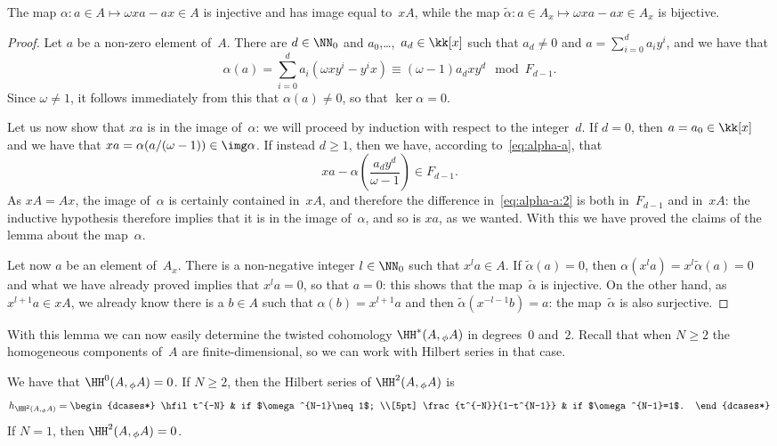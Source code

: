 \begin{Lemma}\label{lemma:comm:phi}
The map $\alpha:a\in A\mapsto \omega xa-ax\in A$ is injective and has image
equal to~$xA$, while the map $\tilde\alpha:a\in A_x\mapsto \omega xa-ax\in
A_x$ is bijective.
\end{Lemma}

\begin{proof}
Let $a$ be a non-zero element of~$A$. There are $d\in\NN_0$ and
$a_0$,\dots,~$a_d\in\kk[x]$ such that $a_d\neq0$ and
$a=\sum_{i=0}^da_iy^i$, and we have that
  \[ \label{eq:alpha-a}
  \alpha(a) = \sum_{i=0}^da_i(\omega xy^i-y^ix)
        \equiv (\omega-1)a_dxy^d \mod F_{d-1}.
  \]
Since $\omega\neq1$, it follows immediately from this that
$\alpha(a)\neq0$, so that $\ker\alpha=0$.

Let us now show that $xa$ is in the image of~$\alpha$: we will proceed by
induction with respect to the integer~$d$. If $d=0$, then $a=a_0\in\kk[x]$
and we have that $xa=\alpha(a/(\omega-1))\in\img\alpha$. If instead
$d\geq1$, then we have, according to~\eqref{eq:alpha-a}, that
  \[ \label{eq:alpha-a:2}
  xa - \alpha\left(\frac{a_dy^d}{\omega-1}\right) \in F_{d-1}.
  \]
As $xA=Ax$, the image of~$\alpha$ is certainly contained in~$xA$, and
therefore the difference in~\eqref{eq:alpha-a:2} is both in~$F_{d-1}$ and
in~$xA$: the inductive hypothesis therefore implies that it is in the image
of~$\alpha$, and so is $xa$, as we wanted. With this we have proved the
claims of the lemma about the map~$\alpha$.

Let now $a$ be an element of~$A_x$. There is a non-negative integer
$l\in\NN_0$ such that $x^la\in A$. If $\tilde\alpha(a)=0$, then
$\alpha(x^la)=x^l\tilde\alpha(a)=0$ and what we have already proved implies
that $x^la=0$, so that $a=0$: this shows that the map~$\tilde\alpha$ is
injective. On the other hand, as $x^{l+1}a\in xA$, we already know there is
a $b\in A$ such that $\alpha(b)=x^{l+1}a$ and then
$\tilde\alpha(x^{-l-1}b)=a$: the map~$\tilde\alpha$ is also surjective.
\end{proof}

With this lemma we can now easily determine the twisted cohomology
$\HH^*(A,{}_\phi A)$ in degrees~$0$ and~$2$. Recall that when $N\geq2$ the
homogeneous components of~$A$ are finite-dimensional, so we can work with
Hilbert series in that case.

\begin{Proposition}
We have that $\HH^0(A,{}_\phi A) = 0$. If $N\geq2$, then the Hilbert series of
$\HH^2(A,{}_\phi A)$ is
  \[
  h_{\HH^2(A,{}_\phi A)} = 
        \begin{dcases*}
        \hfil t^{-N} & if $\omega^{N-1}\neq1$; \\[5pt]
        \frac{t^{-N}}{1-t^{N-1}} & if $\omega^{N-1}=1$.
        \end{dcases*}
  \]
If $N=1$, then $\HH^2(A,{}_\phi A)=0$.
\end{Proposition}

